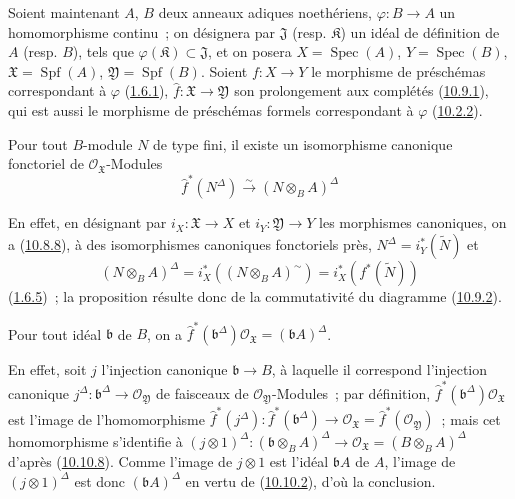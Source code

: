 \begin{env}[10.10.7]
\label{I.10.10.7-fr}
Soient maintenant $A$, $B$ deux anneaux adiques noethériens,
$\varphi:B\to A$ un homomorphisme continu~; on désignera par
$\mathfrak{J}$ (resp. $\mathfrak{K}$) un idéal de définition de $A$
(resp. $B$), tels que $\varphi(\mathfrak{K})\subset\mathfrak{J}$, et
on posera $X=\operatorname{Spec}(A)$, $Y=\operatorname{Spec}(B)$,
$\mathfrak{X}=\operatorname{Spf}(A)$,
$\mathfrak{Y}=\operatorname{Spf}(B)$. Soient $f:X\to Y$ le morphisme
de préschémas correspondant à $\varphi$
(\hyperref[I.1.6.1-fr]{1.6.1}), $\widehat f:\mathfrak{X}\to
\mathfrak{Y}$ son prolongement aux complétés
(\hyperref[I.10.9.1-fr]{10.9.1}), qui est aussi le morphisme de
préschémas formels correspondant à $\varphi$
(\hyperref[I.10.2.2-fr]{10.2.2}).
\end{env}

\begin{proposition}[10.10.8]
\label{I.10.10.8-fr}
Pour tout $B$-module $N$ de type fini, il existe un isomorphisme
canonique fonctoriel de $\mathscr{O}_{\mathfrak{X}}$-Modules
\[
  \widehat f^*(N^\Delta)
  \xrightarrow{\sim}
  (N\otimes_B A)^\Delta
\]
\end{proposition}

En effet, en désignant par $i_X:\mathfrak{X}\to X$ et
$i_Y:\mathfrak{Y}\to Y$ les morphismes canoniques, on a
(\hyperref[I.10.8.8-fr]{10.8.8}), à des isomorphismes canoniques
fonctoriels près, $N^\Delta=i_Y^*(\widetilde N)$ et
\[
  (N\otimes_B A)^\Delta
  =i_X^*((N\otimes_B A)^{\sim})
  =i_X^*(f^*(\widetilde N))
\]
(\hyperref[I.1.6.5-fr]{1.6.5})~; la proposition résulte donc de la
commutativité du diagramme (\hyperref[I.10.9.2-fr]{10.9.2}).

\begin{corollary}[10.10.9]
\label{I.10.10.9-fr}
Pour tout idéal $\mathfrak b$ de $B$, on a
$\widehat f^*(\mathfrak b^\Delta)\mathscr{O}_{\mathfrak{X}}
=(\mathfrak bA)^\Delta$.
\end{corollary}

En effet, soit $j$ l'injection canonique $\mathfrak b\to B$, à laquelle
il correspond l'injection canonique
$j^\Delta:\mathfrak b^\Delta\to\mathscr{O}_{\mathfrak{Y}}$ de
faisceaux de $\mathscr{O}_{\mathfrak{Y}}$-Modules~; par définition,
$\widehat f^*(\mathfrak b^\Delta)\mathscr{O}_{\mathfrak{X}}$ est
l'image de l'homomorphisme
$\widehat f^*(j^\Delta):\widehat f^*(\mathfrak b^\Delta)\to
\mathscr{O}_{\mathfrak{X}}=\widehat f^*(\mathscr{O}_{\mathfrak{Y}})$~;
mais cet homomorphisme s'identifie à
$(j\otimes1)^\Delta:(\mathfrak b\otimes_B A)^\Delta\to
\mathscr{O}_{\mathfrak{X}}=(B\otimes_B A)^\Delta$ d'après
(\hyperref[I.10.10.8-fr]{10.10.8}). Comme l'image de $j\otimes1$ est
l'idéal $\mathfrak bA$ de $A$, l'image de $(j\otimes1)^\Delta$ est
donc $(\mathfrak bA)^\Delta$ en vertu de
(\hyperref[I.10.10.2-fr]{10.10.2}), d'où la conclusion.

